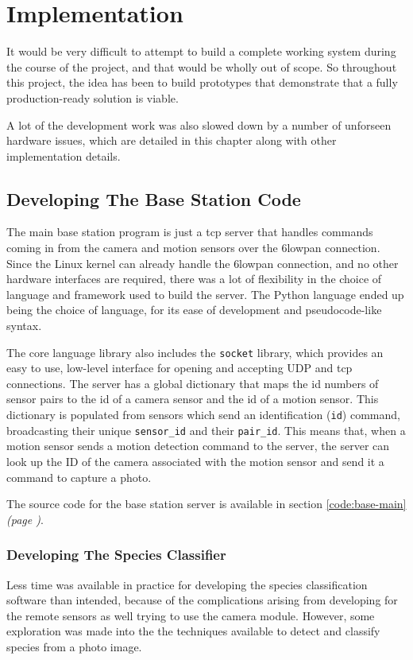 \chapter{Implementation}

It would be very difficult to attempt to build a complete working system
during the course of the project, and that would be wholly out of scope. So
throughout this project, the idea has been to build prototypes that
demonstrate that a fully production-ready solution is viable.

A lot of the development work was also slowed down by a number of unforseen
hardware issues, which are detailed in this chapter along with other
implementation details.

\section{Developing The Base Station Code}
The main base station program is just a \acrshort{tcp} server that handles
commands coming in from the camera and motion sensors over the \gls{6lowpan}
connection. Since the Linux kernel can already handle the \gls{6lowpan}
connection, and no other hardware interfaces are required, there was a lot of
flexibility in the choice of language and framework used to build the server.
The Python language ended up being the choice of language, for its ease of
development and pseudocode-like syntax.

The core language library also includes the \texttt{socket} library, which
provides an easy to use, low-level interface for opening and accepting UDP
and \acrshort{tcp} connections. The server has a global dictionary that maps
the id numbers of sensor pairs to the id of a camera sensor and the id of a
motion sensor. This dictionary is populated from sensors which send an
identification (\texttt{id}) command, broadcasting their unique
\texttt{sensor\_id} and their \texttt{pair\_id}. This means that, when a
motion sensor sends a motion detection command to the server, the server can
look up the ID of the camera associated with the motion sensor and send it a
command to capture a photo.

The source code for the base station server is available in section
\ref{code:base-main} \textit{(page \pageref{code:base-main})}.

\subsection{Developing The Species Classifier}
Less time was available in practice for developing the species classification
software than intended, because of the complications arising from developing
for the remote sensors as well trying to use the camera module. However, some
exploration was made into the the techniques available to detect and classify
species from a photo image.

